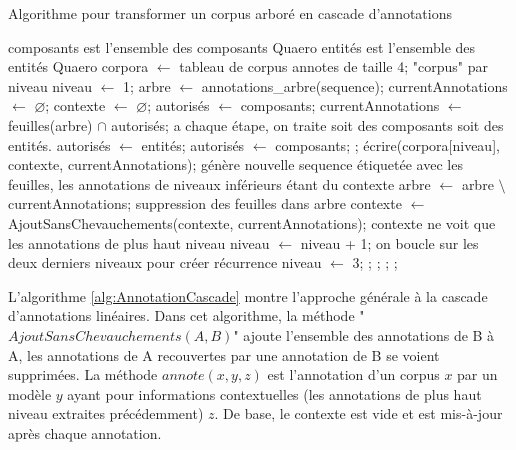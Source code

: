 \documentclass[12pt,a4paper,times,twoside,openright]{report}
\begin{document}
\begin{algorithm}[ht!]
\caption{Algorithme pour transformer un corpus arboré en cascade d'annotations}
\label{alg:CorpusTreeToCascade}
\begin{algorithmic}
    \State \Comment composants est l'ensemble des composants Quaero
    \State \Comment entités est l'ensemble des entités Quaero
    \State corpora $\gets$ tableau de corpus annotes de taille 4;  "corpus" par niveau
    \State niveau $\gets$ 1;
        \State arbre $\gets$ annotations\_arbre(sequence);
        \State currentAnnotations $\gets$ $\varnothing$;
        \State contexte $\gets$ $\varnothing$;
        \State autorisés $\gets$ composants;
            \State currentAnnotations $\gets$ feuilles(arbre) $\cap$ autorisés;
            \State \Comment a chaque étape, on traite soit des composants soit des entités.
                \State autorisés $\gets$ entités;
            \Else
                \State autorisés $\gets$ composants;
            \EndIf;
            \State écrire(corpora[niveau], contexte, currentAnnotations); \Comment génère nouvelle sequence étiquetée avec les feuilles, les annotations de niveaux inférieurs étant du contexte
            \State arbre $\gets$ arbre $\setminus$ currentAnnotations; \Comment suppression des feuilles dans arbre
            \State contexte $\gets$ AjoutSansChevauchements(contexte, currentAnnotations); \Comment contexte ne voit que les annotations de plus haut niveau
            \State niveau $\gets$ niveau + 1;
             \Comment on boucle sur les deux derniers niveaux pour créer récurrence
                \State niveau $\gets$ 3;
            \EndIf;
        \EndWhile;
    \EndFor;
    \EndFunction;
\end{algorithmic}
\end{algorithm}

L'algorithme \ref{alg:AnnotationCascade} montre l'approche générale à la cascade d'annotations linéaires. Dans cet algorithme, la méthode "$AjoutSansChevauchements(A,B)$" ajoute l'ensemble des annotations de B à A, les annotations de A recouvertes par une annotation de B se voient supprimées. La méthode $annote(x,y,z)$ est l'annotation d'un corpus $x$ par un modèle $y$ ayant pour informations contextuelles (les annotations de plus haut niveau extraites précédemment) $z$. De base, le contexte est vide et est mis-à-jour après chaque annotation.
\end{document}
